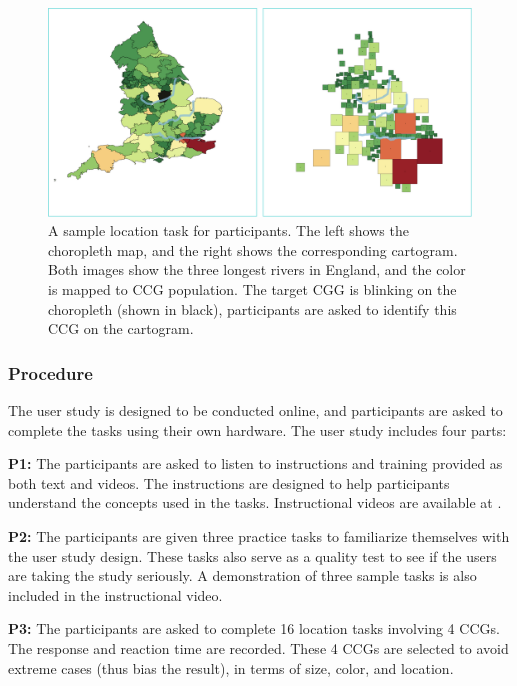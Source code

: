     {
        \begin{figure}[tb!]
            \centering
            \includegraphics[width=\columnwidth,keepaspectratio]{figure/evaluation/task.png}
            \caption{A sample location task for participants. The left shows the choropleth map, and the right shows the corresponding cartogram. Both images show the three longest rivers in England, and the color is mapped to CCG population. The target CGG is blinking on the choropleth (shown in black), participants are asked to identify this CCG on the cartogram.}
            \label{fig:task}
        \end{figure}
    }

\subsubsection{Procedure}

The user study is designed to be conducted online, and participants are asked to complete the tasks using their own hardware. The user study includes four parts:

\textbf{P1:} The participants are asked to listen to instructions and training provided as both text and videos. The instructions are designed to help participants understand the concepts used in the tasks. Instructional videos are available at .

\textbf{P2:} The participants are given three practice tasks to familiarize themselves with the user study design. These tasks also serve as a quality test to see if the users are taking the study seriously. A demonstration of three sample tasks is also included in the instructional video.

\textbf{P3:} The participants are asked to complete 16 location tasks involving 4 CCGs. The response and reaction time are recorded. These 4 CCGs are selected to avoid extreme cases (thus bias the result), in terms of size, color, and location.

